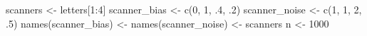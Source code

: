\documentclass[
]{book}
\newenvironment{Shaded}{\begin{snugshade}}{\end{snugshade}}
\newcommand{\DecValTok}[1]{\textcolor[rgb]{0.00,0.00,0.81}{#1}}
\newcommand{\FunctionTok}[1]{\textcolor[rgb]{0.00,0.00,0.00}{#1}}
\newcommand{\NormalTok}[1]{#1}
\newcommand{\OtherTok}[1]{\textcolor[rgb]{0.56,0.35,0.01}{#1}}
\newcommand{\SpecialCharTok}[1]{\textcolor[rgb]{0.00,0.00,0.00}{#1}}
\begin{document}
\begin{Shaded}
\begin{Highlighting}[]
\NormalTok{scanners }\OtherTok{\textless{}{-}}\NormalTok{ letters[}\DecValTok{1}\SpecialCharTok{:}\DecValTok{4}\NormalTok{]}
\NormalTok{scanner\_bias }\OtherTok{\textless{}{-}} \FunctionTok{c}\NormalTok{(}\DecValTok{0}\NormalTok{, }\DecValTok{1}\NormalTok{, .}\DecValTok{4}\NormalTok{, .}\DecValTok{2}\NormalTok{)}
\NormalTok{scanner\_noise }\OtherTok{\textless{}{-}} \FunctionTok{c}\NormalTok{(}\DecValTok{1}\NormalTok{, }\DecValTok{1}\NormalTok{, }\DecValTok{2}\NormalTok{, .}\DecValTok{5}\NormalTok{)}
\FunctionTok{names}\NormalTok{(scanner\_bias) }\OtherTok{\textless{}{-}} \FunctionTok{names}\NormalTok{(scanner\_noise) }\OtherTok{\textless{}{-}}\NormalTok{ scanners}
\NormalTok{n }\OtherTok{\textless{}{-}} \DecValTok{1000}


\end{Highlighting}
\end{Shaded}
\end{document}
